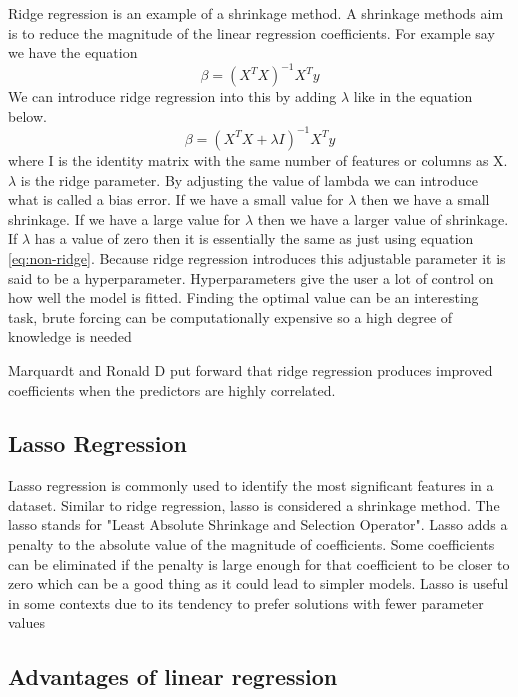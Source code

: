 Ridge regression is an example of a shrinkage method. A shrinkage methods aim is to reduce the magnitude of the linear regression coefficients. For example say we have the equation
\begin{equation}\label{eq:non-ridge}
\beta = (X^T X)^{-1}X^T y
\end{equation}
We can introduce ridge regression into this by adding $\lambda$ like in the equation below.
\begin{equation}
\beta = (X^T X + \lambda I)^{-1}X^T y
\end{equation}
where I is the identity matrix with the same number of features or columns as X. $\lambda$ is the ridge parameter. By adjusting the value of lambda we can introduce what is called a bias error. If we have a small value for $\lambda$ then we have a small shrinkage. If we have a large value for $\lambda$ then we have a larger value of shrinkage. If $\lambda$ has a value of zero then it is essentially the same as just using equation \ref{eq:non-ridge}. Because ridge regression introduces this adjustable parameter it is said to be a hyperparameter. Hyperparameters give the user a lot of control on how well the model is fitted. Finding the optimal value can be an interesting task, brute forcing can be computationally expensive so a high degree of knowledge is needed

Marquardt and Ronald D\cite{doi:10.1080/00031305.1975.10479105} put forward that ridge regression produces improved coefficients when the predictors are highly correlated. 

\subsection{Lasso Regression}

Lasso regression is commonly used to identify the most significant features in a dataset. Similar to ridge regression, lasso is considered a shrinkage method. The lasso stands for "Least Absolute Shrinkage and Selection Operator". Lasso adds a penalty to the absolute value of the magnitude of coefficients. Some coefficients can be eliminated if the penalty is large enough for that coefficient to be closer to zero which can be a good thing as it could lead to simpler models. Lasso is useful in some contexts due to its tendency to prefer solutions with fewer parameter values \cite{lassoAdvantage1}

\subsection{Advantages of linear regression}

